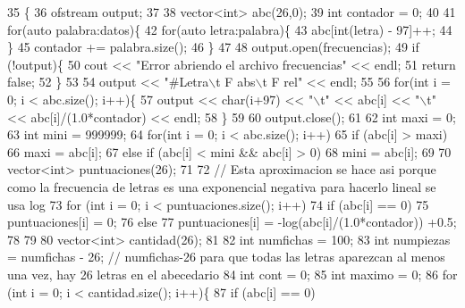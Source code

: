 \begin{DoxyCode}
35                                                                   \{
36     ofstream output;
37 
38     vector<int> abc(26,0);
39     \textcolor{keywordtype}{int} contador = 0;
40 
41     \textcolor{keywordflow}{for}(\textcolor{keyword}{auto} palabra:datos)\{
42         \textcolor{keywordflow}{for}(\textcolor{keyword}{auto} letra:palabra)\{
43             abc[int(letra) - 97]++;
44         \}
45         contador += palabra.size();
46     \}
47 
48     output.open(frecuencias);
49     \textcolor{keywordflow}{if} (!output)\{
50         cout << \textcolor{stringliteral}{"Error abriendo el archivo frecuencias"} << endl;
51         \textcolor{keywordflow}{return} \textcolor{keyword}{false};
52     \}
53 
54     output << \textcolor{stringliteral}{"#Letra\(\backslash\)t F abs\(\backslash\)t F rel"} << endl;
55 
56     \textcolor{keywordflow}{for}(\textcolor{keywordtype}{int} i = 0; i < abc.size(); i++)\{
57         output << char(i+97) << \textcolor{stringliteral}{"\(\backslash\)t"} << abc[i] << \textcolor{stringliteral}{"\(\backslash\)t"} << abc[i]/(1.0*contador) << endl;
58     \}
59 
60     output.close();
61 
62     \textcolor{keywordtype}{int} maxi = 0;
63     \textcolor{keywordtype}{int} mini = 999999;
64     \textcolor{keywordflow}{for}(\textcolor{keywordtype}{int} i = 0; i < abc.size(); i++)
65         \textcolor{keywordflow}{if} (abc[i] > maxi)
66             maxi = abc[i];
67         \textcolor{keywordflow}{else} \textcolor{keywordflow}{if} (abc[i] < mini && abc[i] > 0)
68             mini = abc[i];
69 
70     vector<int> puntuaciones(26);
71 
72     \textcolor{comment}{// Esta aproximacion se hace asi porque como la frecuencia de letras es una exponencial negativa para
       hacerlo lineal se usa log}
73     \textcolor{keywordflow}{for} (\textcolor{keywordtype}{int} i = 0; i < puntuaciones.size(); i++)
74         \textcolor{keywordflow}{if} (abc[i] == 0)
75             puntuaciones[i] = 0;
76         \textcolor{keywordflow}{else}
77             puntuaciones[i] = -log(abc[i]/(1.0*contador)) +0.5;
78 
79 
80     vector<int> cantidad(26);
81 
82     \textcolor{keywordtype}{int} numfichas = 100;
83     \textcolor{keywordtype}{int} numpiezas = numfichas - 26; \textcolor{comment}{// numfichas-26 para que todas las letras aparezcan al menos una vez,
       hay 26 letras en el abecedario}
84     \textcolor{keywordtype}{int} cont = 0;
85     \textcolor{keywordtype}{int} maximo = 0;
86     \textcolor{keywordflow}{for} (\textcolor{keywordtype}{int} i = 0; i < cantidad.size(); i++)\{
87         \textcolor{keywordflow}{if} (abc[i] == 0)

\end{DoxyCode}
